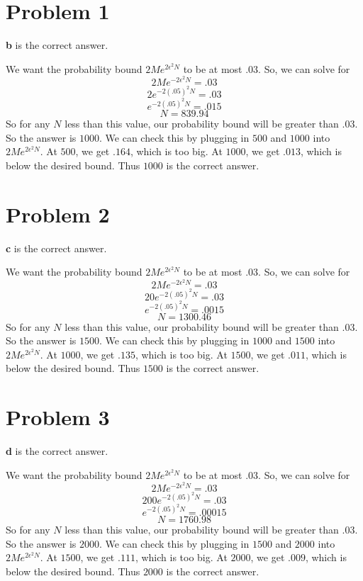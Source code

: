\documentclass{article}
\begin{document}
\section*{Problem 1}
\textbf{b} is the correct answer.

\noindent We want the probability bound $2Me^{2\epsilon^2N}$ to be at most $.03$.
So, we can solve for
\[ 2Me^{-2\epsilon^2N} = .03 \]
\[ 2e^{-2(.05)^2N} = .03 \]
\[ e^{-2(.05)^2N} = .015 \]
\[ N = 839.94 \]
So for any $N$ less than this value, our probability bound will be greater
than $.03$. So the answer is $1000$. We can check this by plugging in
$500$ and $1000$ into $2Me^{2\epsilon^2N}$. At $500$, we get $.164$, which is
too big. At $1000$, we get $.013$, which is below the desired bound. Thus
$1000$ is the correct answer.

\section*{Problem 2}
\textbf{c} is the correct answer.

\noindent We want the probability bound $2Me^{2\epsilon^2N}$ to be at most $.03$.
So, we can solve for
\[ 2Me^{-2\epsilon^2N} = .03 \]
\[ 20e^{-2(.05)^2N} = .03 \]
\[ e^{-2(.05)^2N} = .0015 \]
\[ N = 1300.46 \]
So for any $N$ less than this value, our probability bound will be greater
than $.03$. So the answer is $1500$. We can check this by plugging in
$1000$ and $1500$ into $2Me^{2\epsilon^2N}$. At $1000$, we get $.135$, which is
too big. At $1500$, we get $.011$, which is below the desired bound. Thus
$1500$ is the correct answer.

\section*{Problem 3}
\textbf{d} is the correct answer.

\noindent We want the probability bound $2Me^{2\epsilon^2N}$ to be at most $.03$.
So, we can solve for
\[ 2Me^{-2\epsilon^2N} = .03 \]
\[ 200e^{-2(.05)^2N} = .03 \]
\[ e^{-2(.05)^2N} = .00015 \]
\[ N = 1760.98 \]
So for any $N$ less than this value, our probability bound will be greater
than $.03$. So the answer is $2000$. We can check this by plugging in
$1500$ and $2000$ into $2Me^{2\epsilon^2N}$. At $1500$, we get $.111$, which is
too big. At $2000$, we get $.009$, which is below the desired bound. Thus
$2000$ is the correct answer.
\end{document}
